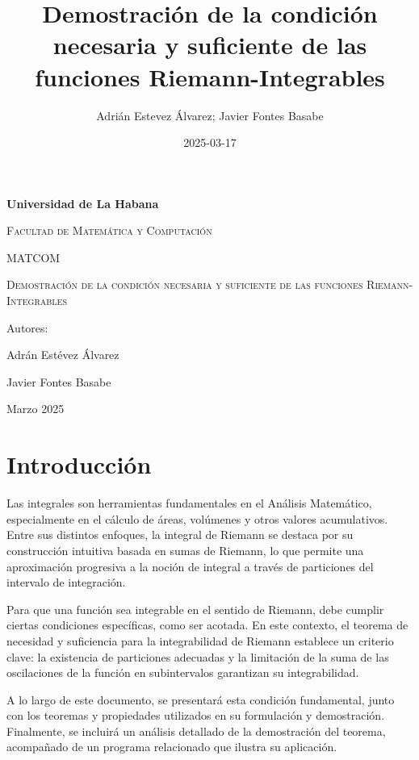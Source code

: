 \documentclass[10pt]{article}
\title{Demostración de la condición necesaria y suficiente de las funciones Riemann-Integrables}
\date{2025-03-17}
\author{Adrián Estevez Álvarez; Javier Fontes Basabe  }
\begin{document}
\begin{titlepage}
		\centering
			{\bfseries\LARGE Universidad de La Habana \par}
				\vspace{1cm}
			{\scshape\Large Facultad de Matemática y Computación \par}
			{\scshape\Large MATCOM \par}
				\vspace{3cm}
			{\scshape\Huge Demostración de la condición necesaria y suficiente de las funciones Riemann-Integrables \par}
				\vspace{3cm}
			
				\vfill
			{\Large Autores: \par}
			{\Large Adrán Estévez Álvarez \par}
			{\Large Javier Fontes Basabe \par}
				\vfill
			{\Large Marzo 2025 \par}
	\end{titlepage}


\section{Introducción}
Las integrales son herramientas fundamentales en el Análisis Matemático, especialmente en el cálculo de áreas, volúmenes y otros valores acumulativos. Entre sus distintos enfoques, la integral de Riemann se destaca por su construcción intuitiva basada en sumas de Riemann, lo que permite una aproximación progresiva a la noción de integral a través de particiones del intervalo de integración. \par

Para que una función sea integrable en el sentido de Riemann, debe cumplir ciertas condiciones específicas, como ser acotada. En este contexto, el teorema de necesidad y suficiencia para la integrabilidad de Riemann establece un criterio clave: la existencia de particiones adecuadas y la limitación de la suma de las oscilaciones de la función en subintervalos garantizan su integrabilidad.\par

A lo largo de este documento, se presentará esta condición fundamental, junto con los teoremas y propiedades utilizados en su formulación y demostración. Finalmente, se incluirá un análisis detallado de la demostración del teorema, acompañado de un programa relacionado que ilustra su aplicación.\par
\end{document}
